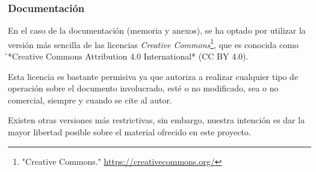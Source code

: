 \documentclass[
]{article}
\begin{document}
\hypertarget{documentaciuxf3n}{%
\subsubsection{Documentación}\label{documentaciuxf3n}}

En el caso de la documentación (memoria y anexos), se ha optado por
utilizar la versión más sencilla de las licencias \emph{Creative
Commons}\footnote{"Creative Commons." \url{https://creativecommons.org/}},
que es conocida como ́*Creative Commons Attribution 4.0 International*
(CC BY 4.0).

Esta licencia es bastante permisiva ya que autoriza a realizar cualquier
tipo de operación sobre el documento involucrado, esté o no modificado,
sea o no comercial, siempre y cuando se cite al autor.

Existen otras versiones más restrictivas, sin embargo, nuestra intención
es dar la mayor libertad posible sobre el material ofrecido en este
proyecto.
\end{document}
